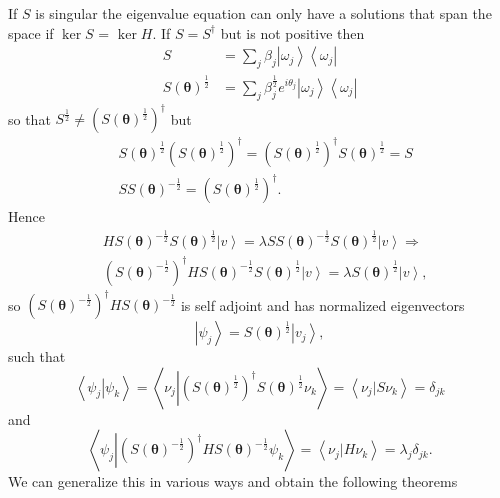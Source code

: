 \documentclass[aps,preprint]{revtex4}%
\begin{document}
If $S$ is singular the eigenvalue equation can only have a solutions that span
the space if $\ker S$ = $\ker H.$ If $S=S^{\dagger}$ but is not positive then
\begin{align}
S  &  =\sum_{j}\beta_{j}\left\vert \omega_{j}\right\rangle \left\langle
\omega_{j}\right\vert \\
S\left(  \mathbf{\theta}\right)  ^{\frac{1}{2}}  &  =\sum_{j}\beta_{j}%
^{\frac{1}{2}}e^{i\theta_{j}}\left\vert \omega_{j}\right\rangle \left\langle
\omega_{j}\right\vert
\end{align}
so that $S^{\frac{1}{2}}\neq\left(  S\left(  \mathbf{\theta}\right)
^{\frac{1}{2}}\right)  ^{\dagger}$ but
\begin{align}
&  S\left(  \mathbf{\theta}\right)  ^{\frac{1}{2}}\left(  S\left(
\mathbf{\theta}\right)  ^{\frac{1}{2}}\right)  ^{\dagger}=\left(  S\left(
\mathbf{\theta}\right)  ^{\frac{1}{2}}\right)  ^{\dagger}S\left(
\mathbf{\theta}\right)  ^{\frac{1}{2}}=S\\
&  SS\left(  \mathbf{\theta}\right)  ^{-\frac{1}{2}}=\left(  S\left(
\mathbf{\theta}\right)  ^{\frac{1}{2}}\right)  ^{\dagger}.
\end{align}
Hence
\begin{align}
&  HS\left(  \mathbf{\theta}\right)  ^{-\frac{1}{2}}S\left(  \mathbf{\theta
}\right)  ^{\frac{1}{2}}\left\vert v\right\rangle =\lambda SS\left(
\mathbf{\theta}\right)  ^{-\frac{1}{2}}S\left(  \mathbf{\theta}\right)
^{\frac{1}{2}}\left\vert v\right\rangle \Rightarrow\nonumber\\
&  \left(  S\left(  \mathbf{\theta}\right)  ^{-\frac{1}{2}}\right)  ^{\dagger
}HS\left(  \mathbf{\theta}\right)  ^{-\frac{1}{2}}S\left(  \mathbf{\theta
}\right)  ^{\frac{1}{2}}\left\vert v\right\rangle =\lambda S\left(
\mathbf{\theta}\right)  ^{\frac{1}{2}}\left\vert v\right\rangle ,
\end{align}
so $\left(  S\left(  \mathbf{\theta}\right)  ^{-\frac{1}{2}}\right)
^{\dagger}HS\left(  \mathbf{\theta}\right)  ^{-\frac{1}{2}}$ is self adjoint
and has normalized eigenvectors
\begin{equation}
\left\vert \psi_{j}\right\rangle =S\left(  \mathbf{\theta}\right)  ^{\frac
{1}{2}}\left\vert v_{j}\right\rangle ,
\end{equation}
such that
\begin{equation}
\left\langle \psi_{j}\left\vert \psi_{k}\right.  \right\rangle =\left\langle
\nu_{j}\left\vert \left(  S\left(  \mathbf{\theta}\right)  ^{\frac{1}{2}%
}\right)  ^{\dagger}S\left(  \mathbf{\theta}\right)  ^{\frac{1}{2}}\nu
_{k}\right.  \right\rangle =\left\langle \nu_{j}\left\vert S\nu_{k}\right.
\right\rangle =\delta_{jk}%
\end{equation}
and
\begin{equation}
\left\langle \psi_{j}\left\vert \left(  S\left(  \mathbf{\theta}\right)
^{-\frac{1}{2}}\right)  ^{\dagger}HS\left(  \mathbf{\theta}\right)
^{-\frac{1}{2}}\psi_{k}\right.  \right\rangle =\left\langle \nu_{j}\left\vert
H\nu_{k}\right.  \right\rangle =\lambda_{j}\delta_{jk}.
\end{equation}
We can generalize this in various ways and obtain the following theorems
\end{document}
